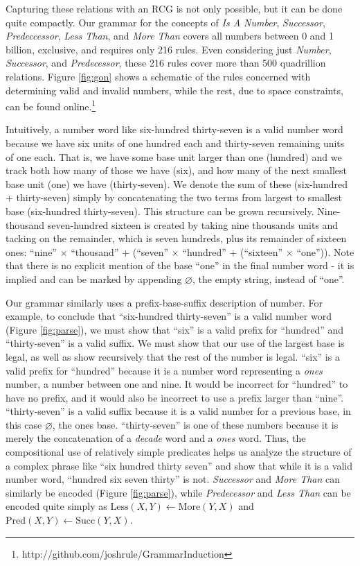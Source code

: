 \documentclass[10pt,letterpaper]{article}
\begin{document}
Capturing these relations with an RCG is not only possible, but it can
be done quite compactly. Our grammar for the concepts of \emph{Is A
  Number}, \emph{Successor}, \emph{Predeccessor}, \emph{Less Than},
and \emph{More Than} covers all numbers between 0 and 1 billion,
exclusive, and requires only 216 rules. Even considering just
\emph{Number}, \emph{Successor}, and \emph{Predecessor}, these 216
rules cover more than 500 quadrillion relations. Figure \ref{fig:gon}
shows a schematic of the rules concerned with determining valid and
invalid numbers, while the rest, due to space constraints, can be
found online.\footnote{http://github.com/joshrule/GrammarInduction}

Intuitively, a number word like six-hundred thirty-seven is a valid
number word because we have six units of one hundred each and
thirty-seven remaining units of one each. That is, we have some base
unit larger than one (hundred) and we track both how many of those we
have (six), and how many of the next smallest base unit (one) we have
(thirty-seven). We denote the sum of these (six-hundred +
thirty-seven) simply by concatenating the two terms from largest to
smallest base (six-hundred thirty-seven). This structure can be grown
recursively. Nine-thousand seven-hundred sixteen is created by taking
nine thousands units and tacking on the remainder, which is seven
hundreds, plus its remainder of sixteen ones: ``nine'' $\times$
``thousand'' $+$ (``seven'' $\times$ ``hundred'' + (``sixteen''
$\times$ ``one'')). Note that there is no explicit mention of the base
``one'' in the final number word - it is implied and can be marked by
appending $\varnothing$, the empty string, instead of ``one''.

Our grammar similarly uses a prefix-base-suffix description of
number. For example, to conclude that ``six-hundred thirty-seven'' is
a valid number word (Figure \ref{fig:parse}), we must show that
``six'' is a valid prefix for ``hundred'' and ``thirty-seven'' is a
valid suffix. We must show that our use of the largest base is legal,
as well as show recursively that the rest of the number is
legal. ``six'' is a valid prefix for ``hundred'' because it is a
number word representing a \emph{ones} number, a number between one
and nine. It would be incorrect for ``hundred'' to have no prefix, and
it would also be incorrect to use a prefix larger than
``nine''. ``thirty-seven'' is a valid suffix because it is a valid
number for a previous base, in this case $\varnothing$, the ones
base. ``thirty-seven'' is one of these numbers because it is merely
the concatenation of a \emph{decade} word and a \emph{ones}
word. Thus, the compositional use of relatively simple predicates
helps us analyze the structure of a complex phrase like ``six hundred
thirty seven'' and show that while it is a valid number word,
``hundred six seven thirty'' is not. \emph{Successor} and \emph{More
  Than} can similarly be encoded (Figure \ref{fig:parse}), while
\emph{Predecessor} and \emph{Less Than} can be encoded quite simply as
$\text{Less}(X,Y) \leftarrow \text{More}(Y,X)$ and $\text{Pred}(X,Y)
\leftarrow \text{Succ}(Y,X)$.
\end{document}
